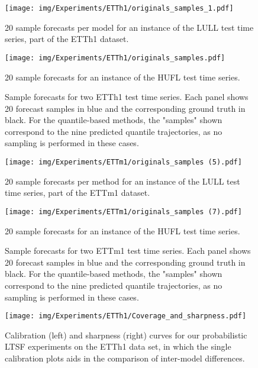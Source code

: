 \documentclass[a4paper,oneside,bibliography=totoc]{scrbook}
\begin{document}
\begin{figure}[h]
\centering
\begin{minipage}{0.45\textwidth}
  \centering
  \texttt{[image: img/Experiments/ETTh1/originals\_samples\_1.pdf]}
  \caption{20 sample forecasts per model for an instance of the LULL test time series, part of the ETTh1 dataset.}
  \label{fig:ETTh1_samples}
\end{minipage}
\hfill
\begin{minipage}{0.45\textwidth}
  \centering
  \texttt{[image: img/Experiments/ETTh1/originals\_samples.pdf]}
  \caption{20 sample forecasts for an instance of the HUFL test time series.}
  \label{fig:ETTh1_samples_2}
\end{minipage}
\caption{Sample forecasts for two ETTh1 test time series. Each panel shows 20 forecast samples in blue and the corresponding ground truth in black. For the quantile-based methods, the "samples" shown correspond to the nine predicted quantile trajectories, as no sampling is performed in these cases.}
\end{figure}

\begin{figure}[h]
\centering
\begin{minipage}{0.45\textwidth}
  \centering
  \texttt{[image: img/Experiments/ETTm1/originals\_samples (5).pdf]}
  \caption{20 sample forecasts per method for an instance of the LULL test time series, part of the ETTm1 dataset.}
  \label{fig:ETTm1_samples}
\end{minipage}
\hfill
\begin{minipage}{0.45\textwidth}
  \centering
  \texttt{[image: img/Experiments/ETTm1/originals\_samples (7).pdf]}
  \caption{20 sample forecasts for an instance of the HUFL test time series.}
  \label{fig:ETTm1_samples_2}
\end{minipage}
\caption{Sample forecasts for two ETTm1 test time series. Each panel shows 20 forecast samples in blue and the corresponding ground truth in black. For the quantile-based methods, the "samples" shown correspond to the nine predicted quantile trajectories, as no sampling is performed in these cases.}
\end{figure}



\begin{figure}
    \centering
    \texttt{[image: img/Experiments/ETTh1/Coverage\_and\_sharpness.pdf]}
    \caption{Calibration (left) and sharpness (right) curves for our probabilistic LTSF experiments on the ETTh1 data set, in which the single calibration plots aids in the comparison of inter-model differences.}
    \label{fig:cov_sha_etth1_2}
\end{figure}
\end{document}
